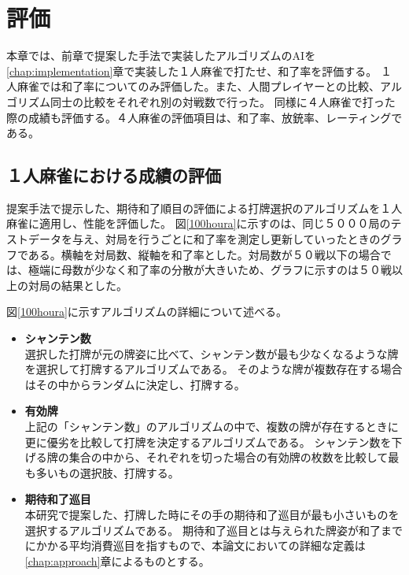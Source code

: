 \chapter{評価}
\label{chap:evaluation}

本章では、前章で提案した手法で実装したアルゴリズムのAIを\ref{chap:implementation}章で実装した１人麻雀で打たせ、和了率を評価する。
１人麻雀では和了率についてのみ評価した。また、人間プレイヤーとの比較、アルゴリズム同士の比較をそれぞれ別の対戦数で行った。
同様に４人麻雀で打った際の成績も評価する。４人麻雀の評価項目は、和了率、放銃率、レーティングである。

\section{１人麻雀における成績の評価}
提案手法で提示した、期待和了順目の評価による打牌選択のアルゴリズムを１人麻雀に適用し、性能を評価した。
図\ref{100houra}に示すのは、同じ５０００局のテストデータを与え、対局を行うごとに和了率を測定し更新していったときのグラフである。横軸を対局数、縦軸を和了率とした。対局数が５０戦以下の場合では、極端に母数が少なく和了率の分散が大きいため、グラフに示すのは５０戦以上の対局の結果とした。

図\ref{100houra}に示すアルゴリズムの詳細について述べる。

\begin{itemize}
 \item {\bf シャンテン数} \mbox{}\\ 
  選択した打牌が元の牌姿に比べて、シャンテン数が最も少なくなるような牌を選択して打牌するアルゴリズムである。
  そのような牌が複数存在する場合はその中からランダムに決定し、打牌する。
 \item {\bf 有効牌} \mbox{}\\
      上記の「シャンテン数」のアルゴリズムの中で、複数の牌が存在するときに更に優劣を比較して打牌を決定するアルゴリズムである。
      シャンテン数を下げる牌の集合の中から、それぞれを切った場合の有効牌の枚数を比較して最も多いもの選択肢、打牌する。
 \item {\bf 期待和了巡目} \mbox{}\\
      本研究で提案した、打牌した時にその手の期待和了巡目が最も小さいものを選択するアルゴリズムである。
      期待和了巡目とは与えられた牌姿が和了までにかかる平均消費巡目を指すもので、本論文においての詳細な定義は\ref{chap:approach}章によるものとする。
\end{itemize}

